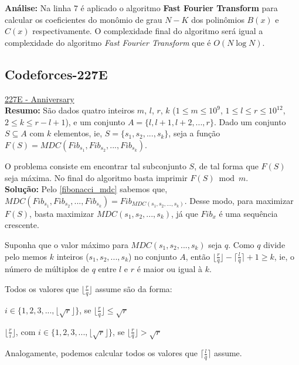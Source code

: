 \textbf{Análise:}
Na linha $7$ é aplicado o algoritmo \textbf{Fast Fourier Transform} para calcular os coeficientes do monômio de grau $N-K$ dos 
polinômios $B(x)$ e $C(x)$ respectivamente. O complexidade final do algoritmo será igual a complexidade do algoritmo \textit{Fast Fourier Transform} que é $O(N\log N)$.



\subsection{Codeforces-227E}
\href{http://codeforces.com/contest/227/problem/E}{227E - Anniversary}\\

\textbf{Resumo:}
São dados quatro inteiros $m$, $l$, $r$, $k$ ($1\leq m\leq 10^9$, $1\leq l \leq r \leq 10^{12}$, $2\leq k\leq r-l+1$), 
e um conjunto $A = \{l,l+1,l+2,...,r\}$.
Dado um conjunto $S \subseteq A$ com $k$ elementos, ie, $S = \{s_1, s_2,...,s_k\}$, seja a função 
$F(S) = MDC(Fib_{s_1}, Fib_{s_2}, ..., Fib_{s_k})$.

O problema consiste em encontrar tal subconjunto $S$, de tal forma que $F(S)$ seja máxima. No final do algoritmo basta imprimir 
$F(S) \bmod m$.
\\

\textbf{Solução:}
Pelo \autoref{fibonacci_mdc} sabemos que, $MDC(Fib_{s_1}, Fib_{s_2}, ..., Fib_{s_k}) = Fib_{MDC(s_1,s_2,...,s_k)}$.
Desse modo, para maximizar $F(S)$, basta maximizar $MDC(s_1,s_2,...,s_k)$, já que $Fib_x$ é uma sequência crescente.

Suponha que o valor máximo para $MDC(s_1,s_2,...,s_k)$ seja $q$. Como $q$ divide pelo memos $k$ inteiros ($s_1,s_2,...,s_k$)
no conjunto $A$, então $\lfloor \frac{r}{q} \rfloor -\lceil \frac{l}{q} \rceil + 1 \geq k$, ie, o número de múltiplos de $q$ entre $l$ e $r$ é maior ou igual à $k$.

Todos os valores que $\lfloor \frac{r}{q} \rfloor$ assume são da forma:
\newline

$i \in \{1,2,3,...,\lfloor\sqrt{r}\rfloor\}$, se $\lfloor \frac{r}{q} \rfloor \leq \sqrt{r}$

$\lfloor \frac{r}{i} \rfloor$, com $i \in \{1,2,3,...,\lfloor\sqrt{r}\rfloor\}$, se $\lfloor \frac{r}{q} \rfloor > \sqrt{r}$
\newline

Analogamente, podemos calcular todos os valores que $\lceil \frac{l}{q} \rceil$ assume.

